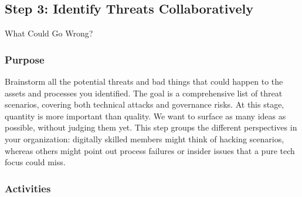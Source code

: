 \subsection{Step 3: Identify Threats Collaboratively}
\label{subsec:Step3}

What Could Go Wrong?

\subsubsection{Purpose}

Brainstorm all the potential threats and bad things that could happen to the
assets and processes you identified. The goal is a comprehensive list of threat
scenarios, covering both technical attacks and governance risks. At this
stage, quantity is more important than quality. We want to surface as many
ideas as possible, without judging them yet. This step groups the different
perspectives in your organization: digitally skilled members might think
of hacking scenarios, whereas others might point out process failures or insider
issues that a pure tech focus could miss.

\subsubsection{Activities}

